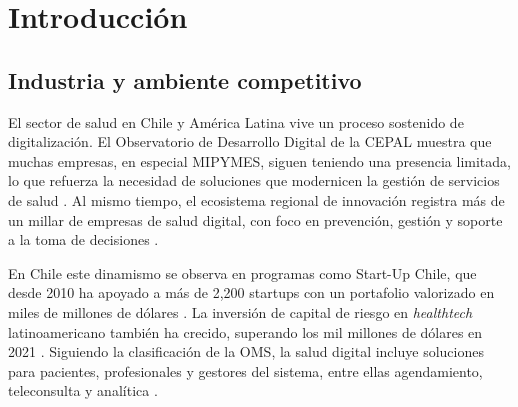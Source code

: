 %
%



%

\section{Introducción}

\subsection{Industria y ambiente competitivo}

El sector de salud en Chile y América Latina vive un proceso sostenido de digitalización. El Observatorio de Desarrollo Digital de la CEPAL muestra que muchas empresas, en especial MIPYMES, siguen teniendo una presencia limitada, lo que refuerza la necesidad de soluciones que modernicen la gestión de servicios de salud \citep{CepalDDO2024}. Al mismo tiempo, el ecosistema regional de innovación registra más de un millar de empresas de salud digital, con foco en prevención, gestión y soporte a la toma de decisiones \citep{IDBLabHolonIQ2024}.

En Chile este dinamismo se observa en programas como Start-Up Chile, que desde 2010 ha apoyado a más de 2{,}200 startups con un portafolio valorizado en miles de millones de dólares \citep{StartUpChile2025}. La inversión de capital de riesgo en \textit{healthtech} latinoamericano también ha crecido, superando los mil millones de dólares en 2021 \citep{EmolHealthtech2023}. Siguiendo la clasificación de la OMS, la salud digital incluye soluciones para pacientes, profesionales y gestores del sistema, entre ellas agendamiento, teleconsulta y analítica \citep{WHOCDHI2018}.

